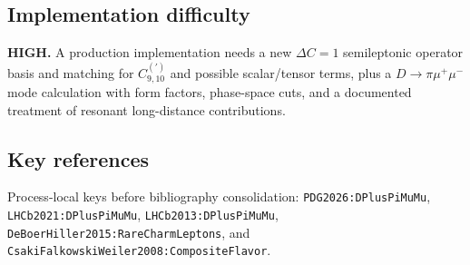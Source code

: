 \subsection*{Implementation difficulty}
\textbf{HIGH.}  A production implementation needs a new \(\Delta C=1\)
semileptonic operator basis and matching for \(C_{9,10}^{(\prime)}\) and
possible scalar/tensor terms, plus a \(D\to\pi\mu^+\mu^-\) mode calculation
with form factors, phase-space cuts, and a documented treatment of resonant
long-distance contributions.

\subsection*{Key references}
Process-local keys before bibliography consolidation:
\texttt{PDG2026:DPlusPiMuMu}, \texttt{LHCb2021:DPlusPiMuMu},
\texttt{LHCb2013:DPlusPiMuMu},
\texttt{DeBoerHiller2015:RareCharmLeptons}, and
\texttt{CsakiFalkowskiWeiler2008:CompositeFlavor}.
